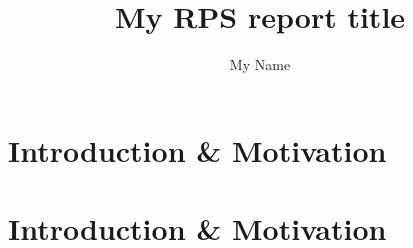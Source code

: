 \documentclass{SVNITPhDrpsPB}
\author{My Name} %
\title{My RPS report title} %
\begin{document}
\addpageborder

\maketitle

\setcounter{page}{2}

\putTableAdmin{}

\putTableTech{}

\putdecleration

\putapproval

\putsvnitack{

}



\putsvnitabstract{

}

\tableofcontents\newpage

\listoffigures\newpage

\listoftables\newpage

\clearpageborder

\setcounter{page}{1}


\chapter{Introduction \& Motivation}


\chapter{Introduction \& Motivation}




\nocite{*}
\end{document}

